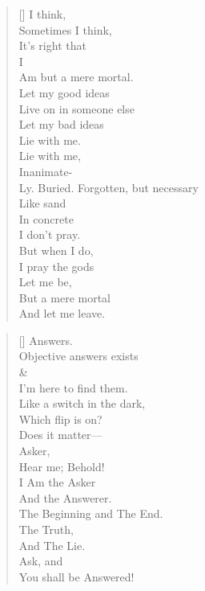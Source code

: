 \documentclass{article}
\begin{document}
\settowidth{\versewidth}{Than Tycho Brahe, or Erra Pater:}
\begin{verse}[\versewidth]
I think, \\
Sometimes I think,\\
It's right that \\
I \\
Am but a mere mortal. \\
Let my good ideas \\
Live on in someone else \\
Let my bad ideas \\
Lie with me. \\
Lie with me, \\
Inanimate- \\
Ly. Buried.
Forgotten, but necessary \\
Like sand \\
In concrete \\
I don't pray. \\
But when I do, \\
I pray the gods\\
Let me be, \\
But a mere mortal \\
And let me leave. \\
\end{verse}


\settowidth{\versewidth}{Than Tycho Brahe, or Erra Pater:}
\begin{verse}[\versewidth]
Answers. \\
Objective answers exists \\
& \\
I'm here to find them. \\
Like a switch in the dark,\\
Which flip is on? \\
Does it matter–– \\
Asker, \\
Hear me; Behold! \\
I Am the Asker \\
And the Answerer. \\
The Beginning and The End. \\
The Truth, \\
And The Lie. \\
Ask, and \\
You shall be Answered! \\
\end{verse}
\end{document}
